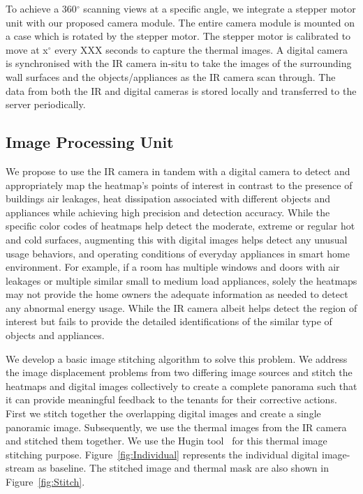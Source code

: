 To achieve a 360$^{\circ}$ scanning views at a specific angle, we integrate a stepper motor unit with our proposed camera module. The entire camera module is mounted on a case which is rotated by the stepper motor. The stepper motor is calibrated to move at x$^{\circ}$ every XXX seconds to capture the thermal images. A digital camera is synchronised with the IR camera in-situ to take the images of the surrounding wall surfaces and the objects/appliances as the IR camera scan through. The data from both the IR and digital cameras is stored locally and transferred to the server periodically.
	
\subsection{Image Processing Unit}
We propose to use the IR camera in tandem with a digital camera to detect and appropriately map the heatmap's points of interest in contrast to the presence of buildings air leakages, heat dissipation associated with different objects and appliances while achieving high precision and detection accuracy. While the specific color codes of heatmaps help detect the moderate, extreme or regular hot and cold surfaces, augmenting this with digital images helps detect any unusual usage behaviors, and operating conditions of everyday appliances in smart home environment. For example, if a room has multiple windows and doors with air leakages or multiple similar small to medium load appliances, solely the heatmaps may not provide the home owners the adequate information as needed to detect any abnormal energy usage. While the IR camera albeit helps detect the region of interest but fails to provide the detailed identifications of the similar type of objects and appliances.

We develop a basic image stitching algorithm to solve this problem. We address the image displacement problems from two differing image sources and stitch the heatmaps and digital images collectively to create a complete panorama such that it can provide meaningful feedback to the tenants for their corrective actions. First we stitch together the overlapping digital images and create a single panoramic image. Subsequently, we use the thermal images from the IR camera and stitched them together. We use the Hugin tool~\cite{XXXX} for this thermal image stitching purpose. Figure~\ref{fig:Individual} represents the individual digital image-stream as baseline. The stitched image and thermal mask are also shown in Figure~\ref{fig:Stitch}. %

